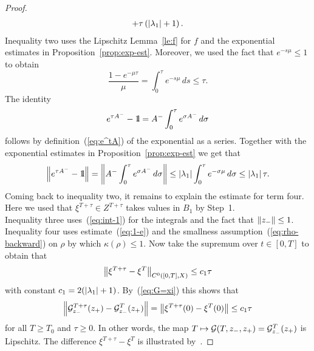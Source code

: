 \documentclass{article}
\begin{document}
\begin{proof}
\begin{equation*}
\begin{split}
     +\tau\left(\mathopen|\lambda_1\mathclose|+1\right).
\end{split}
\end{equation*}
Inequality two uses the Lipschitz Lemma~\ref{le:f} for $f$ and the exponential
estimates in Proposition~\ref{prop:exp-est}.
Moreover, we used the fact that $e^{-s\mu}\le 1$ to obtain
\begin{equation}\label{eq:1-e}
     \frac{1-e^{-\mu\tau}}{\mu}
     =\int_0^\tau e^{-s\mu}\, ds
     \le\tau.
\end{equation}
The identity
\begin{equation}\label{eq:ident-1}
     e^{\tau A^-}-\1=A^-\int_0^\tau e^{\sigma A^-}\, d\sigma
\end{equation}
follows by definition~(\ref{eq:e^tA}) of the exponential as a series. Together with
 the exponential estimates in Proposition~\ref{prop:exp-est} we get that
\begin{equation}\label{eq:e-1}
     \Norm{e^{\tau A^-}-\1}
     =\Norm{A^-\int_0^\tau e^{\sigma A^-}\, d\sigma}
     \le\Abs{\lambda_1}\int_0^\tau e^{-\sigma\mu}\, d\sigma
     \le\Abs{\lambda_1}\tau.
\end{equation}
Coming back to inequality two, it remains to explain the estimate for
term four. Here we used that $\xi^{T+\tau}\in Z^{T+\tau}$
takes values in $B_1$ by Step~1.
\\
Inequality three uses~(\ref{eq:int-1}) for the integrals and the fact that $\mathopen\|{z_-}\mathclose\|\le 1$.
Inequality four uses estimate~(\ref{eq:1-e}) and the smallness assumption~(\ref{eq:rho-backward})
on $\rho$ by which $\kappa(\rho)\le1$. Now take the
supremum over $t\in[0,T]$ to obtain that
\begin{equation}\label{eq:xi-xi}
     \Norm{\xi^{T+\tau}-\xi^T}_{C^0([0,T],X)}
     \le {c_1}\tau
\end{equation}
with constant ${c_1}=2(\mathopen|\lambda_1\mathclose|+1)$. By~(\ref{eq:G=xi}) this shows that
\begin{equation}\label{eq:C0-conv}
     \Norm{\Gg^{T+\tau}_{z_-}(z_+)-\Gg^T_{z_-}(z_+)}
     =\Norm{\xi^{T+\tau}(0)-\xi^T(0)}
     \le {c_1}\tau
\end{equation}
for all $T\ge T_0$ and $\tau\ge 0$. In other words, the map
$T\mapsto {\mathcal{G}}(T,{z_-},z_+)={\mathcal{G}}^T_{z_-}(z_+)$
is Lipschitz. The difference $\xi^{T+\tau}-\xi^T$
is illustrated by~\cite[Fig.~5]{weber:2014a}.


\end{proof}
\end{document}
